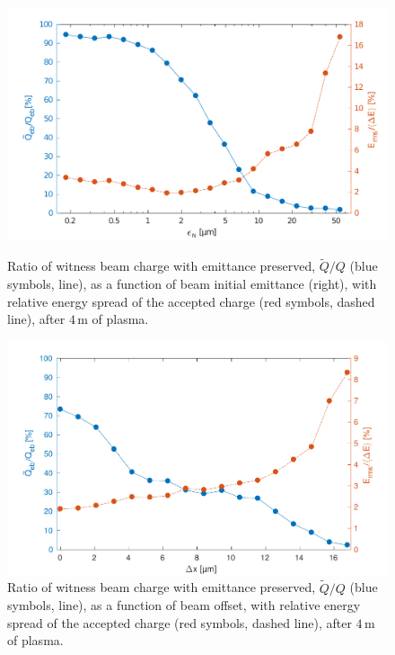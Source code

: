 \documentclass[aps,prstab,reprint,amsmath,amssymb,groupedaddress]{revtex4-1}
\newcommand{\unit}[1]{\,\mathrm{#1}}
\begin{document}
\begin{figure}[hbt]
    \begin{minipage}[t]{.48\textwidth}
        \includegraphics[width=\linewidth,trim={2mm 0mm 2mm 0mm},clip]{figures/beamQualityEmittance}
        \caption{\label{Fig:BeamQEmit} Ratio of witness beam charge with emittance preserved, $\widetilde{Q}/Q$ (blue symbols, line), as a function of beam initial emittance (right), with relative energy spread of the accepted charge (red symbols, dashed line), after $4\unit{m}$ of plasma.}
    \end{minipage}\hfill
    \begin{minipage}[t]{.48\textwidth}
        \includegraphics[width=\linewidth,trim={2mm 0mm 2mm 0mm},clip]{figures/beamQualityOffset}
        \caption{\label{Fig:BeamQOffset} Ratio of witness beam charge with emittance preserved, $\widetilde{Q}/Q$ (blue symbols, line), as a function of beam offset, with relative energy spread of the accepted charge (red symbols, dashed line), after $4\unit{m}$ of plasma.}
    \end{minipage}
\end{figure}
\end{document}
